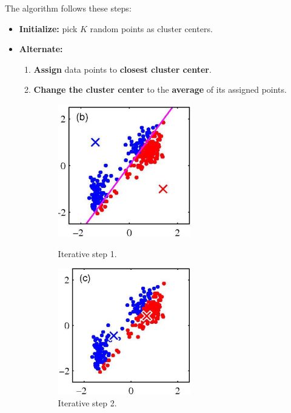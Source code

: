 The algorithm follows these steps:
\begin{itemize}
	\item \textbf{Initialize:} pick $K$ random points as cluster centers.
	\item \textbf{Alternate:}
	\begin{enumerate}
		\item \textbf{Assign} data points to \textbf{closest cluster center}.
		\item \textbf{Change the cluster center} to the \textbf{average} of its assigned points.
		\begin{figure}[H]
			\begin{minipage}[t]{0.42\linewidth} 
				\centering
				\includegraphics[width=0.58\textwidth]{img/kmeans2}
				\caption{Iterative step 1.}
			\end{minipage}        
			\hspace{2.5cm}
			\begin{minipage}[t]{0.42\linewidth} 
				\centering
				\includegraphics[width=0.58\textwidth]{img/kmeans3}
				\caption{Iterative step 2.}

\end{minipage}
\end{figure}
\end{enumerate}
\end{itemize}
